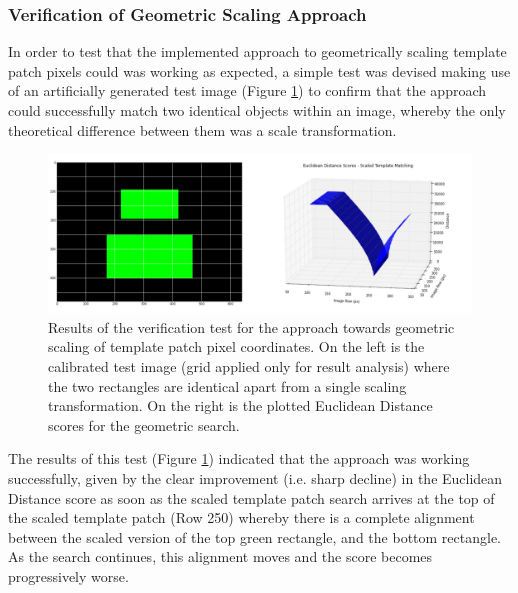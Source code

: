 \subsubsection{Verification of Geometric Scaling Approach}

In order to test that the implemented approach to geometrically scaling template patch pixels could was working as expected, a simple test was devised making use of an artificially generated test image (Figure \ref{fig:graphpic}) to confirm that the approach could successfully match two identical objects within an image, whereby the only theoretical difference between them was a scale transformation.

\begin{figure}[ht!]
\centering
\includegraphics[scale=0.3]{images/3d_graph.pdf}
  \caption{Results of the verification test for the approach towards geometric scaling of template patch pixel coordinates. On the left is the calibrated test image (grid applied only for result analysis) where the two rectangles are identical apart from a single scaling transformation. On the right is the plotted Euclidean Distance scores for the geometric search.}
\label{fig:graphpic}
\end{figure} 

The results of this test (Figure \ref{fig:graphpic}) indicated that the approach was working successfully, given by the clear improvement (i.e. sharp decline) in the Euclidean Distance score as soon as the scaled template patch search arrives at the top of the scaled template patch (Row 250) whereby there is a complete alignment between the scaled version of the top green rectangle, and the bottom rectangle. As the search continues, this alignment moves and the score becomes progressively worse.

